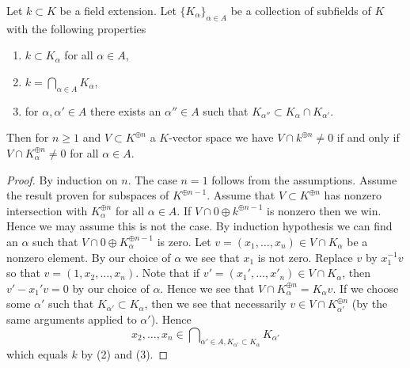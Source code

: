 \begin{lemma}
\label{lemma-intersection-subfields-subspace}
Let $k \subset K$ be a field extension. Let $\{K_\alpha\}_{\alpha \in A}$
be a collection of subfields of $K$ with the following properties
\begin{enumerate}
\item $k \subset K_\alpha$ for all $\alpha \in A$,
\item $k = \bigcap_{\alpha \in A} K_\alpha$,
\item for $\alpha, \alpha' \in A$ there exists an $\alpha'' \in A$
such that $K_{\alpha''} \subset K_\alpha \cap K_{\alpha'}$.
\end{enumerate}
Then for $n \geq 1$ and $V \subset K^{\oplus n}$ a $K$-vector space
we have $V \cap k^{\oplus n} \not = 0$ if and only if
$V \cap K_\alpha^{\oplus n} \not = 0$ for all $\alpha \in A$.
\end{lemma}

\begin{proof}
By induction on $n$. The case $n = 1$ follows from the assumptions.
Assume the result proven for subspaces of $K^{\oplus n - 1}$.
Assume that $V \subset K^{\oplus n}$ has nonzero intersection with
$K_\alpha^{\oplus n}$ for all $\alpha \in A$. If
$V \cap0 \oplus k^{\oplus n - 1}$ is nonzero then we win. Hence we may
assume this is not the case. By induction hypothesis we can find
an $\alpha$ such that $V \cap 0 \oplus K_\alpha^{\oplus n - 1}$
is zero. Let $v = (x_1, \ldots, x_n) \in V \cap K_\alpha$ be a nonzero element.
By our choice of $\alpha$ we see that $x_1$ is not zero.
Replace $v$ by $x_1^{-1}v$ so that $v = (1, x_2, \ldots, x_n)$.
Note that if $v' = (x_1', \ldots, x'_n) \in V \cap K_\alpha$, then
$v' - x_1'v = 0$ by our choice of $\alpha$. Hence we see that
$V \cap K_\alpha^{\oplus n} = K_\alpha v$. If we choose some
$\alpha'$ such that $K_{\alpha'} \subset K_\alpha$, then we
see that necessarily $v \in V \cap K_{\alpha'}^{\oplus n}$ (by the
same arguments applied to $\alpha'$). Hence
$$
x_2, \ldots, x_n \in
\bigcap\nolimits_{\alpha' \in A, K_{\alpha'} \subset K_\alpha} K_{\alpha'}
$$
which equals $k$ by (2) and (3).
\end{proof}

